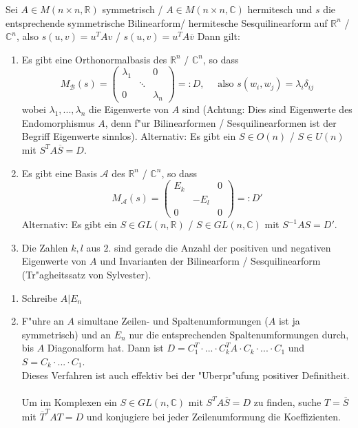\documentclass[8pt, a4paper, twocolumn, landscape]{article}
\begin{document}
\begin{theorem} 
Sei  $A \in M (n \times n, \mathbb{R} )$ symmetrisch / $A \in M (n \times n, \mathbb{C} )$ hermitesch und  $s$ die entsprechende symmetrische Bilinearform/ hermitesche Sesquilinearform auf $\mathbb{R}^n$ / $ \mathbb{C}^n$, also $s(u, v) = u^T A v$ / $s(u, v) = u^T A \overline{v}$ Dann gilt:
\begin{enumerate}
\item Es gibt eine Orthonormalbasis des $\mathbb{R}^n$ / $\mathbb{C}^n$, so dass 
$$
M_\mathcal{B}(s) = \left(\begin{array}{ccc}\lambda_{1} & & 0 
\\ & \ddots & 
\\ 0 & & \lambda_{n}\end{array}\right) =:D, \quad \text{ also } s(w_i, w_j) = \lambda_i \delta_{ij}
$$
wobei $\lambda_1, ..., \lambda_n$ die Eigenwerte von $A$ sind (Achtung: Dies sind Eigenwerte des Endomorphismus $A$, denn f"ur Bilinearformen / Sesquilinearformen ist der Begriff Eigenwerte sinnlos).
Alternativ: Es gibt ein $S \in O(n)$ / $S \in U(n)$ mit $S^T A \overline{S} = D$.
\item Es gibt eine Basis $\mathcal{A}$ des  $\mathbb{R}^n$ / $\mathbb{C}^n$, so dass
$$
M_\mathcal{A}(s) =  \left(\begin{array}{ccc}E_k & & 0 
\\ & -E_l & 
\\ 0 & & 0\end{array}\right) =: D' 
$$
Alternativ: Es gibt ein $S \in GL(n, \mathbb{R})$ / $S \in GL(n, \mathbb{C})$ mit $S^{-1} A S = D'$.
\item Die Zahlen $k, l$ aus $2.$ sind gerade die Anzahl der positiven und negativen Eigenwerte von $A$ und Invarianten der Bilinearform / Sesquilinearform (Tr"agheitssatz von Sylvester).
\end{enumerate}
\end{theorem}

\begin{remark} 
\begin{enumerate}
\item Schreibe $A | E_n$
\item F"uhre an $A$ simultane Zeilen- und Spaltenumformungen ($A$ ist ja symmetrisch) und an $E_n$ nur die entsprechenden Spaltenumformungen durch, bis $A$ Diagonalform hat. Dann ist $D = C_1^T \cdot ... \cdot C_k^T A \cdot C_k \cdot ... \cdot C_1$ und $S = C_k \cdot ... \cdot C_1$.
\\ Dieses Verfahren ist auch effektiv bei der "Uberpr"ufung positiver Definitheit.
\\
\\
Um im Komplexen ein $S \in GL(n, \mathbb{C})$ mit $S^T A \overline{S} = D$ zu finden, suche $T = \overline{S}$ mit $\overline{T}^T A T = D$ und konjugiere bei jeder Zeilenumformung die Koeffizienten.
\end{enumerate}
\end{remark}
\end{document}
